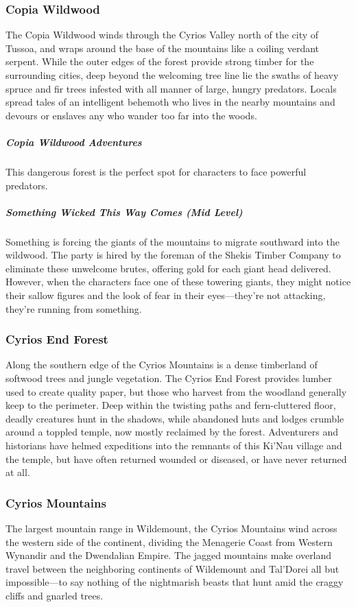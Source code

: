 \documentclass[10pt,a4paper,twoside,bg=print,twocolumn,openany,nodeprecatedcode]{dndbook}
\begin{document}
\subsubsection{Copia Wildwood}
The Copia Wildwood winds through the Cyrios Valley north of the city of Tussoa, and wraps around the base of the mountains like a coiling verdant serpent. While the outer edges of the forest provide strong timber for the surrounding cities, deep beyond the welcoming tree line lie the swaths of heavy spruce and fir trees infested with all manner of large, hungry predators. Locals spread tales of an intelligent behemoth who lives in the nearby mountains and devours or enslaves any who wander too far into the woods.

\subparagraph{Copia Wildwood Adventures}
This dangerous forest is the perfect spot for characters to face powerful predators.

\subparagraph{Something Wicked This Way Comes (Mid Level)}
Something is forcing the giants of the mountains to migrate southward into the wildwood. The party is hired by the foreman of the Shekis Timber Company to eliminate these unwelcome brutes, offering gold for each giant head delivered. However, when the characters face one of these towering giants, they might notice their sallow figures and the look of fear in their eyes—they're not attacking, they're running from something.

\subsubsection{Cyrios End Forest}
Along the southern edge of the Cyrios Mountains is a dense timberland of softwood trees and jungle vegetation. The Cyrios End Forest provides lumber used to create quality paper, but those who harvest from the woodland generally keep to the perimeter. Deep within the twisting paths and fern-cluttered floor, deadly creatures hunt in the shadows, while abandoned huts and lodges crumble around a toppled temple, now mostly reclaimed by the forest. Adventurers and historians have helmed expeditions into the remnants of this Ki'Nau village and the temple, but have often returned wounded or diseased, or have never returned at all.

\subsubsection{Cyrios Mountains}
The largest mountain range in Wildemount, the Cyrios Mountains wind across the western side of the continent, dividing the Menagerie Coast from Western Wynandir and the Dwendalian Empire. The jagged mountains make overland travel between the neighboring continents of Wildemount and Tal'Dorei all but impossible—to say nothing of the nightmarish beasts that hunt amid the craggy cliffs and gnarled trees.
\end{document}
